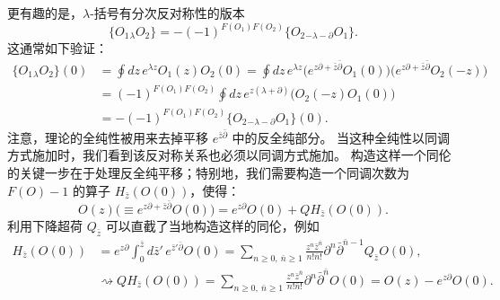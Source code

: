 更有趣的是，$\lambda$-括号有分次反对称性的版本
\begin{equation}\tag{3.66}
\{O_1{}_\lambda O_2\}=-(-1)^{F(O_1)F(O_2)}\{O_2{}_{-\lambda-\partial}O_1\}.
\end{equation}
这通常如下验证：
\begin{equation}\tag{3.67}
\begin{aligned}
\{O_1{}_\lambda O_2\}(0)
&=\oint dz\,e^{\lambda z}O_1(z)O_2(0)
=\oint dz\,e^{\lambda z}\bigl(e^{z\partial+\bar z\bar\partial}O_1(0)\bigr)\bigl(e^{z\partial+\bar z\bar\partial}O_2(-z)\bigr)\\
&=(-1)^{F(O_1)F(O_2)}\oint dz\,e^{z(\lambda+\partial)}\bigl(O_2(-z)O_1(0)\bigr)\\
&=-(-1)^{F(O_1)F(O_2)}\{O_2{}_{-\lambda-\partial}O_1\}(0).
\end{aligned}
\end{equation}
注意，理论的全纯性被用来去掉平移 $e^{\bar z\bar\partial}$ 中的反全纯部分。
当这种全纯性以同调方式施加时，我们看到该反对称关系也必须以同调方式施加。
构造这样一个同伦的关键一步在于处理反全纯平移；特别地，我们需要构造一个同调次数为 $F(O)-1$ 的算子 $H_{\bar z}(O(0))$，使得：
\begin{equation}\tag{3.68}
O(z)\bigl(\equiv e^{z\partial+\bar z\bar\partial}O(0)\bigr)=e^{z\partial}O(0)+QH_{\bar z}(O(0)).
\end{equation}
利用下降超荷 $Q_{\bar z}$ 可以直截了当地构造这样的同伦，例如
\begin{equation}\tag{3.69}
\begin{aligned}
H_{\bar z}(O(0))
&=e^{z\partial}\int_0^{\bar z}d\bar z'\,e^{\bar z'\bar\partial}O(0)
=\sum_{n\ge0,\ \bar n\ge1}\frac{z^n\bar z^{\bar n}}{n!\bar n!}\partial^n\bar\partial^{\bar n-1}Q_{\bar z}O(0),\\
&\rightsquigarrow QH_{\bar z}(O(0))
=\sum_{n\ge0,\ \bar n\ge1}\frac{z^n\bar z^{\bar n}}{n!\bar n!}\partial^n\bar\partial^{\bar n}O(0)
=O(z)-e^{z\partial}O(0).
\end{aligned}
\end{equation}

